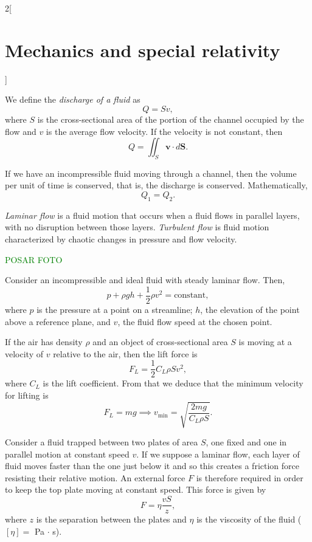 \documentclass[../../../main.tex]{subfiles}
\begin{document}
\begin{multicols}{2}[\section{Mechanics and special relativity}]
\begin{concept}
\end{concept}
\begin{definition}
We define the \textit{discharge of a fluid} as $$Q=Sv,$$ where $S$ is the cross-sectional area of the portion of the channel occupied by the flow and $v$ is the average flow velocity. If the velocity is not constant, then $$Q=\iint_S\boldsymbol{v}\cdot d\boldsymbol{S}.$$
\end{definition}
\begin{concept}
If we have an incompressible fluid moving through a channel, then the volume per unit of time is conserved, that is, the discharge is conserved. Mathematically, $$Q_1=Q_2.$$
\end{concept}
\begin{definition}
\textit{Laminar flow} is a fluid motion that occurs when a fluid flows in parallel layers, with no disruption between those layers. \textit{Turbulent flow} is fluid motion characterized by chaotic changes in pressure and flow velocity. 
\end{definition}
\textcolor{green}{POSAR FOTO}
\begin{concept}
Consider an incompressible and ideal fluid with steady laminar flow. Then, $$p+\rho gh+\frac{1}{2}\rho v^2=\text{constant},$$ where $p$ is the pressure at a point on a streamline; $h$, the elevation of the point above a reference plane, and $v$, the fluid flow speed at the chosen point.
\end{concept}
\begin{concept}
If the air has density $\rho$ and an object of cross-sectional area $S$ is moving at a velocity of $v$ relative to the air, then the lift force is $$F_L=\frac{1}{2}C_L\rho Sv^2,$$ where $C_L$ is the lift coefficient. From that we deduce that the minimum velocity for lifting is $$F_L=mg\implies v_\text{min}=\sqrt{\frac{2mg}{C_L\rho S}}.$$
\end{concept}
\begin{concept}[Viscosity]
Consider a fluid trapped between two plates of area $S$, one fixed and one in parallel motion at constant speed $v$. If we suppose a laminar flow, each layer of fluid moves faster than the one just below it and so this creates a friction force  resisting their relative motion. An external force $F$ is therefore required in order to keep the top plate moving at constant speed. This force is given by $$F=\eta\frac{vS}{z},$$ where $z$ is the separation between the plates and $\eta$ is the viscosity of the fluid ($[\eta]=$ Pa $\cdot$ s). 

\end{concept}
\end{multicols}
\end{document}

